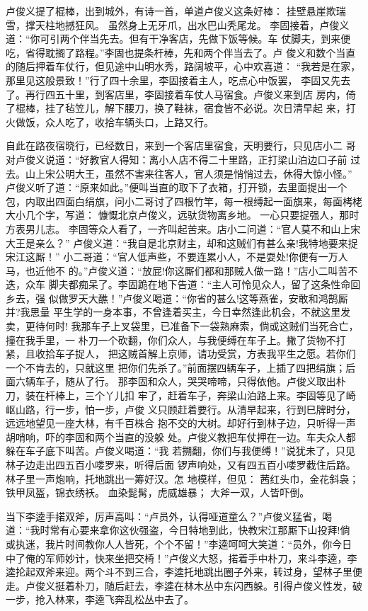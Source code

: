卢俊义提了棍棒，出到城外，有诗一首，单道卢俊义这条好棒：
挂壁悬崖欺瑞雪，撑天柱地撼狂风。
虽然身上无牙爪，出水巴山秃尾龙。
李固接着，卢俊义道：“你可引两个伴当先去。但有干净客店，先做下饭等候。车
仗脚夫，到来便吃，省得耽搁了路程。”李固也提条杆棒，先和两个伴当去了。卢
俊义和数个当直的随后押着车仗行，但见途中山明水秀，路阔坡平，心中欢喜道：
“我若是在家，那里见这般景致！”行了四十余里，李固接着主人，吃点心中饭罢，
李固又先去了。再行四五十里，到客店里，李固接着车仗人马宿食。卢俊义来到店
房内，倚了棍棒，挂了毡笠儿，解下腰刀，换了鞋袜，宿食皆不必说。次日清早起
来，打火做饭，众人吃了，收拾车辆头口，上路又行。

自此在路夜宿晓行，已经数日，来到一个客店里宿食，天明要行，只见店小二
哥对卢俊义说道：“好教官人得知：离小人店不得二十里路，正打梁山泊边口子前
过去。山上宋公明大王，虽然不害来往客人，官人须是悄悄过去，休得大惊小怪。”
卢俊义听了道：“原来如此。”便叫当直的取下了衣箱，打开锁，去里面提出一个
包，内取出四面白绢旗，问小二哥讨了四根竹竿，每一根缚起一面旗来，每面栲栳
大小几个字，写道：
慷慨北京卢俊义，远驮货物离乡地。
一心只要捉强人，那时方表男儿志。
李固等众人看了，一齐叫起苦来。店小二问道：“官人莫不和山上宋大王是亲么？”
卢俊义道：“我自是北京财主，却和这贼们有甚么亲!我特地要来捉宋江这厮！”
小二哥道：“官人低声些，不要连累小人，不是耍处!你便有一万人马，也近他不
的。”卢俊义道：“放屁!你这厮们都和那贼人做一路！”店小二叫苦不迭，众车
脚夫都痴呆了。李固跪在地下告道：“主人可怜见众人，留了这条性命回乡去，强
似做罗天大醮！”卢俊义喝道：“你省的甚么!这等燕雀，安敢和鸿鹄厮并?我思量
平生学的一身本事，不曾逢着买主，今日幸然逢此机会，不就这里发卖，更待何时!
我那车子上叉袋里，已准备下一袋熟麻索，倘或这贼们当死合亡，撞在我手里，一
朴刀一个砍翻，你们众人，与我便缚在车子上。撇了货物不打紧，且收拾车子捉人，
把这贼首解上京师，请功受赏，方表我平生之愿。若你们一个不肯去的，只就这里
把你们先杀了。”前面摆四辆车子，上插了四把绢旗；后面六辆车子，随从了行。
那李固和众人，哭哭啼啼，只得依他。卢俊义取出朴刀，装在杆棒上，三个丫儿扣
牢了，赶着车子，奔梁山泊路上来。李固等见了崎岖山路，行一步，怕一步，卢俊
义只顾赶着要行。从清早起来，行到巳牌时分，远远地望见一座大林，有千百株合
抱不交的大树。却好行到林子边，只听得一声胡哨响，吓的李固和两个当直的没躲
处。卢俊义教把车仗押在一边。车夫众人都躲在车子底下叫苦。卢俊义喝道：“我
若搠翻，你们与我便缚！”说犹未了，只见林子边走出四五百小喽罗来，听得后面
锣声响处，又有四五百小喽罗截住后路。林子里一声炮响，托地跳出一筹好汉。怎
地模样，但见：
茜红头巾，金花斜袅；
铁甲凤盔，锦衣绣袄。
血染髭髯，虎威雄暴；
大斧一双，人皆吓倒。

当下李逵手掿双斧，厉声高叫：“卢员外，认得哑道童么？”卢俊义猛省，喝
道：“我时常有心要来拿你这伙强盗，今日特地到此，快教宋江那厮下山投拜!倘
或执迷，我片时间教你人人皆死，个个不留！”李逵呵呵大笑道：“员外，你今日
中了俺的军师妙计，快来坐把交椅！”卢俊义大怒，掿着手中朴刀，来斗李逵，李
逵抡起双斧来迎。两个斗不到三合，李逵托地跳出圈子外来，转过身，望林子里便
走。卢俊义挺着朴刀，随后赶去，李逵在林木丛中东闪西躲。引得卢俊义性发，破
一步，抢入林来，李逵飞奔乱松丛中去了。

